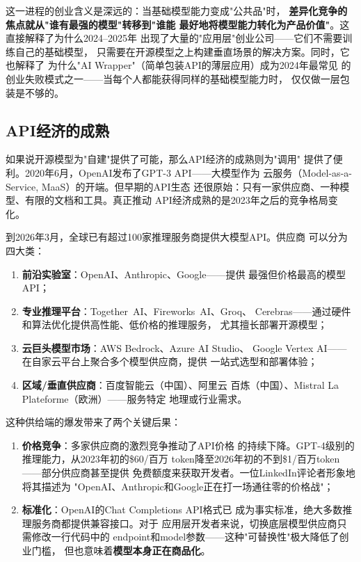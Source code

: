 这一进程的创业含义是深远的：当基础模型能力变成"公共品"时，
\textbf{差异化竞争的焦点就从"谁有最强的模型"转移到"谁能
最好地将模型能力转化为产品价值"}。这直接解释了为什么2024--2025年
出现了大量的"应用层"创业公司——它们不需要训练自己的基础模型，
只需要在开源模型之上构建垂直场景的解决方案。同时，它也解释了
为什么"AI Wrapper"（简单包装API的薄层应用）成为2024年最常见
的创业失败模式之一——当每个人都能获得同样的基础模型能力时，
仅仅做一层包装是不够的。

\subsection{API经济的成熟}

如果说开源模型为"自建"提供了可能，那么API经济的成熟则为"调用"
提供了便利。2020年6月，OpenAI发布了GPT-3 API——大模型作为
云服务（Model-as-a-Service, MaaS）的开端。但早期的API生态
还很原始：只有一家供应商、一种模型、有限的文档和工具。真正推动
API经济成熟的是2023年之后的竞争格局变化。

到2026年3月，全球已有超过100家推理服务商提供大模型API。供应商
可以分为四大类：

\begin{enumerate}
  \item \textbf{前沿实验室}：OpenAI、Anthropic、Google——提供
    最强但价格最高的模型API；
  \item \textbf{专业推理平台}：Together~AI、Fireworks~AI、Groq、
    Cerebras——通过硬件和算法优化提供高性能、低价格的推理服务，
    尤其擅长部署开源模型；
  \item \textbf{云巨头模型市场}：AWS Bedrock、Azure AI Studio、
    Google Vertex AI——在自家云平台上聚合多个模型供应商，提供
    一站式选型和部署体验；
  \item \textbf{区域/垂直供应商}：百度智能云（中国）、阿里云
    百炼（中国）、Mistral La Plateforme（欧洲）——服务特定
    地理或行业需求。
\end{enumerate}

这种供给端的爆发带来了两个关键后果：

\begin{enumerate}
  \item \textbf{价格竞争}：多家供应商的激烈竞争推动了API价格
    的持续下降。GPT-4级别的推理能力，从2023年初的\$60/百万
    token降至2026年初的不到\$1/百万token——部分供应商甚至提供
    免费额度来获取开发者。一位LinkedIn评论者形象地将其描述为
    "OpenAI、Anthropic和Google正在打一场通往零的价格战"；
  \item \textbf{标准化}：OpenAI的Chat Completions API格式已
    成为事实标准，绝大多数推理服务商都提供兼容接口。对于
    应用层开发者来说，切换底层模型供应商只需修改一行代码中的
    endpoint和model参数——这种"可替换性"极大降低了创业门槛，
    但也意味着\textbf{模型本身正在商品化}。
\end{enumerate}

